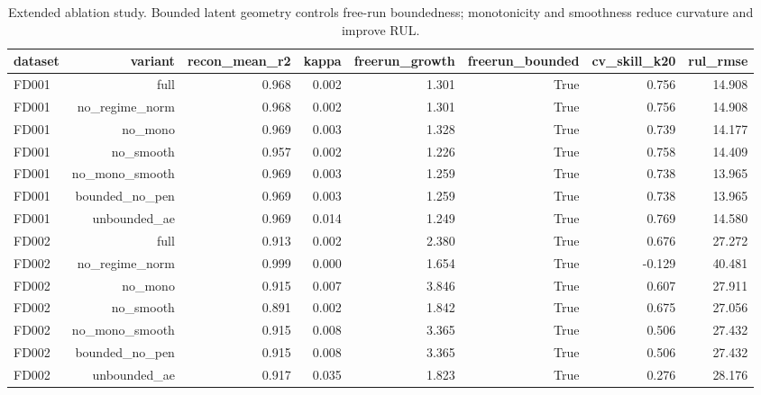\begin{table}[t]
\centering
\caption{Extended ablation study. Bounded latent geometry controls free-run boundedness; monotonicity and smoothness reduce curvature and improve RUL.}
\label{tab:ablation_extended}
\begin{tabular}{lrrrrrrr}
\toprule
dataset & variant & recon\_mean\_r2 & kappa & freerun\_growth & freerun\_bounded & cv\_skill\_k20 & rul\_rmse \\
\midrule
FD001 & full & 0.968 & 0.002 & 1.301 & True & 0.756 & 14.908 \\
FD001 & no\_regime\_norm & 0.968 & 0.002 & 1.301 & True & 0.756 & 14.908 \\
FD001 & no\_mono & 0.969 & 0.003 & 1.328 & True & 0.739 & 14.177 \\
FD001 & no\_smooth & 0.957 & 0.002 & 1.226 & True & 0.758 & 14.409 \\
FD001 & no\_mono\_smooth & 0.969 & 0.003 & 1.259 & True & 0.738 & 13.965 \\
FD001 & bounded\_no\_pen & 0.969 & 0.003 & 1.259 & True & 0.738 & 13.965 \\
FD001 & unbounded\_ae & 0.969 & 0.014 & 1.249 & True & 0.769 & 14.580 \\
FD002 & full & 0.913 & 0.002 & 2.380 & True & 0.676 & 27.272 \\
FD002 & no\_regime\_norm & 0.999 & 0.000 & 1.654 & True & -0.129 & 40.481 \\
FD002 & no\_mono & 0.915 & 0.007 & 3.846 & True & 0.607 & 27.911 \\
FD002 & no\_smooth & 0.891 & 0.002 & 1.842 & True & 0.675 & 27.056 \\
FD002 & no\_mono\_smooth & 0.915 & 0.008 & 3.365 & True & 0.506 & 27.432 \\
FD002 & bounded\_no\_pen & 0.915 & 0.008 & 3.365 & True & 0.506 & 27.432 \\
FD002 & unbounded\_ae & 0.917 & 0.035 & 1.823 & True & 0.276 & 28.176 \\
\bottomrule
\end{tabular}
\end{table}